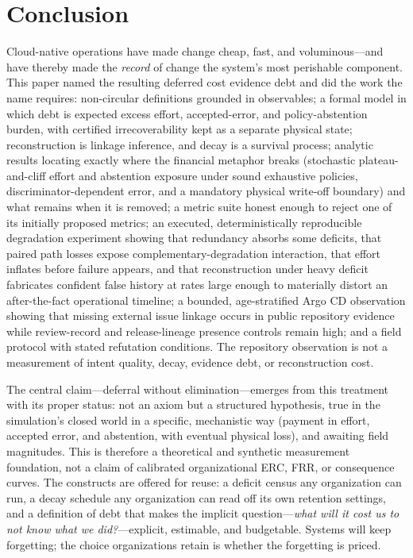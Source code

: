 \section{Conclusion}
\label{sec:conclusion}

Cloud-native operations have made change cheap, fast, and voluminous---and have
thereby made the \emph{record} of change the system's most perishable component.
This paper named the resulting deferred cost evidence debt and did the work the
name requires: non-circular definitions grounded in observables; a formal model in
which debt is expected excess effort, accepted-error, and policy-abstention burden,
with certified irrecoverability kept as a separate physical state; reconstruction is linkage
inference, and decay is a survival process; analytic results locating exactly where
the financial metaphor breaks (stochastic plateau-and-cliff effort and
abstention exposure under sound exhaustive policies, discriminator-dependent error, and a
mandatory physical write-off boundary) and
what remains when it is removed; a metric suite honest enough to reject one of its
initially proposed metrics; an executed, deterministically reproducible degradation experiment
showing that redundancy absorbs some deficits, that paired path losses expose
complementary-degradation interaction, that effort inflates before failure appears, and
that reconstruction under heavy deficit fabricates confident false history at rates
large enough to materially distort an after-the-fact operational timeline; a bounded,
age-stratified Argo CD observation showing that missing external issue linkage
occurs in public repository evidence while review-record and release-lineage
presence controls remain high; and a field protocol with stated refutation
conditions. The repository observation is not a measurement of intent quality,
decay, evidence debt, or reconstruction cost.

The central claim---deferral without elimination---emerges from this treatment
with its proper status: not an axiom but a structured hypothesis, true in the
simulation's closed world in a specific, mechanistic way (payment in effort,
accepted error, and abstention, with eventual physical loss), and awaiting field
magnitudes. This is therefore a theoretical and synthetic measurement foundation,
not a claim of calibrated organizational ERC, FRR, or consequence curves. The
constructs are offered for
reuse: a deficit census any organization can run, a decay schedule any organization
can read off its own retention settings, and a definition of debt that makes the
implicit question---\emph{what will it cost us to not know what we did?}---explicit,
estimable, and budgetable. Systems will keep forgetting; the choice organizations
retain is whether the forgetting is priced.
